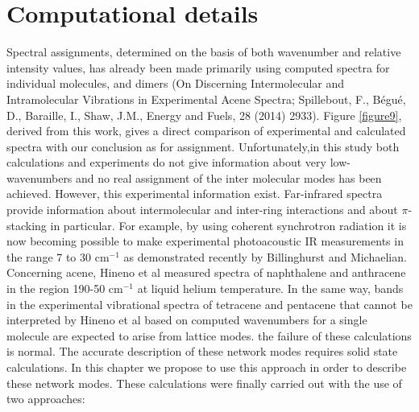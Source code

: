 \section{Computational details}


Spectral assignments, determined on the basis of both wavenumber and relative intensity values, has already been made primarily using computed spectra for individual molecules, and dimers (On Discerning Intermolecular and Intramolecular Vibrations in Experimental Acene Spectra; Spillebout, F., Bégué, D., Baraille, I., Shaw, J.M., Energy and Fuels, 28 (2014) 2933).
Figure \ref{figure9}, derived from this work, gives a direct comparison of experimental and calculated spectra with our conclusion as for assignment. Unfortunately,in this study both calculations and experiments do not give information about very low-wavenumbers and no real assignment of the inter molecular modes has been achieved. However, this experimental information exist. Far-infrared spectra provide information about intermolecular and inter-ring interactions and about $\pi$-stacking in particular. For example, by using coherent synchrotron radiation it is now becoming possible to make experimental photoacoustic IR measurements in the range 7 to 30 cm$^{-1}$ as demonstrated recently by Billinghurst and Michaelian\cite{billinghurst2010photoacoustic}. Concerning acene, Hineno et al \cite{hineno1975far}  measured spectra of naphthalene and anthracene in the region 190-50 cm$^{-1}$ at liquid helium temperature. In the same way, bands in the experimental vibrational spectra of tetracene and pentacene that cannot be interpreted by Hineno et al based on computed wavenumbers for a single molecule are expected to arise from lattice modes. the failure of these calculations is normal. The accurate description of these network modes requires solid state calculations. In this chapter we propose to use this approach in order to describe these network modes. These calculations were finally carried out with the use of two approaches:\\



